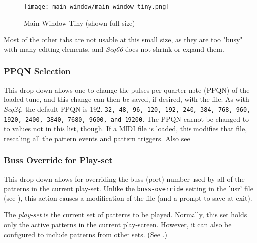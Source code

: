\begin{figure}[H]
   \centering 
   \texttt{[image: main-window/main-window-tiny.png]}
   \caption{Main Window Tiny (shown full size)}
   \label{fig:main_window_tiny}
\end{figure}

   Most of the other tabs are not usable at this small size,
   as they are too "busy" with many editing elements, and
   \textsl{Seq66} does not shrink or expand them.


\subsubsection{PPQN Selection}
\label{subsubsec:introduction_ppqn_selection}

   This drop-down allows one to change the pulses-per-quarter-note (PPQN) of the
   loaded tune, and this change can then be saved, if desired, with the file.
   As with \textsl{Seq24}, the default PPQN is 192.
   \texttt{32, 48, 96, 120, 192, 240, 384, 768, 960, 1920, 2400, 3840,
   7680, 9600, and 19200}.
   The PPQN cannot be changed to to values not in this list, though.
   If a MIDI file is loaded, this modifies that file, rescaling all the
   pattern events and pattern triggers.
   Also see .

\subsubsection{Buss Override for Play-set}
\label{subsubsec:introduction_sets_buss_override}

   This drop-down allows for overriding the buss (port) number used by all of
   the patterns in the current play-set.
   Unlike the \texttt{buss-override} setting in the 'usr' file
   (see ),
   this action causes a modification of the file (and a prompt to save at
   exit).

   The \textsl{play-set} is the current set of patterns to be played.
   Normally, this set holds only the active patterns in the current
   play-screen.
   However, it can also be configured to include patterns from other sets.
   (See .)

